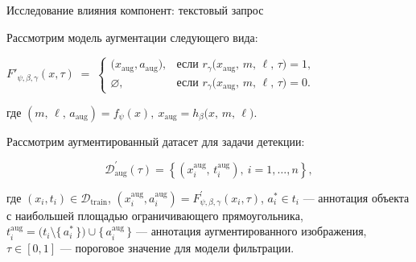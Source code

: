 \documentclass{beamer}
\begin{document}
\begin{frame}{Исследование влияния компонент: текстовый запрос}

\begin{center}
Рассмотрим модель аугментации следующего вида:
\end{center}
\begin{center}
$F'_{\psi,\beta,\gamma}(x, \tau) \;=\;
\begin{cases}
\bigl(x_{\text{aug}}, a_{\text{aug}}), 
& \text{если } r_{\gamma}\bigl(x_{\text{aug}},\,m,\,\ell,\,\tau\bigr) = 1,\\[1em]
\varnothing, 
& \text{если } r_{\gamma}\bigl(x_{\text{aug}},\,m,\,\ell,\,\tau\bigr) = 0.
\end{cases}
$
\end{center}
где 
$ 
(m,\,\ell,\, a_{\text{aug}}) = f_{\psi}(x),  \ x_{\text{aug}} = h_{\beta}\bigl(x,\,m,\, \ell \bigr)$.
\begin{center}
Рассмотрим аугментированный датасет для задачи детекции:
\end{center}
\[
\mathcal{D}^{'}_{\text{aug}}(\tau) =
\left\{
  (x_i^{\text{aug}},\,t_i^{\text{aug}}), \
  i = 1,\dots,n
\right\},
\]

где $(x_i, t_i) \in \mathcal{D}_{\mathrm{train}}$,
$(x_i^{\mathrm{aug}}, a_i^{\mathrm{aug}}) = F^{'}_{\psi,\beta,\gamma}(x_i, \tau)$,
$a_i^* \in t_i$ — аннотация объекта с наибольшей площадью ограничивающего прямоугольника,
$t_i^{\mathrm{aug}} = \bigl(t_i \setminus \{\,a_i^*\,\}\bigr) \cup \{\,a_i^{\mathrm{aug}}\,\}$ — аннотация аугментированного изображения,
$\tau \in [0,1]$ — пороговое значение для модели фильтрации.


\end{frame}
\end{document}
